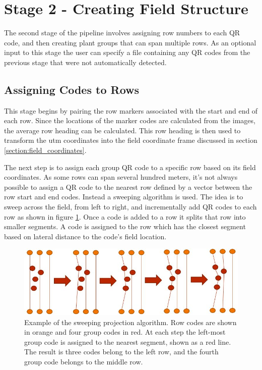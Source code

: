 \section{Stage 2 - Creating Field Structure}
\label{processing-stage2}

The second stage of the pipeline involves assigning row numbers to each QR code, and then creating plant groups that can span multiple rows.  As an optional input to this stage the user can specify a file containing any QR codes from the previous stage that were not automatically detected.  

\subsection{Assigning Codes to Rows}

This stage begins by pairing the row markers associated with the start and end of each row.  Since the locations of the marker codes are calculated from the images, the average row heading can be calculated.  This row heading is then used to transform the \ac{utm} coordinates into the field coordinate frame discussed in section \ref{section:field_coordinates}.

The next step is to assign each group QR code to a specific row based on its field coordinates.  As some rows can span several hundred meters, it's not always possible to assign a QR code to the nearest row defined by a vector between the row start and end codes.  Instead a sweeping algorithm is used.   The idea is to sweep across the field, from left to right, and incrementally add QR codes to each row as shown in figure \ref{figure:sweeping_algorithm}. Once a code is added to a row it splits that row into smaller segments.  A code is assigned to the row which has the closest segment based on lateral distance to the code's field location. 

\begin{figure}
	\centering
    \includegraphics[width=6in]{figures/sweeping_algorithm.jpg}
    \caption[Sweeping projection algorithm]{Example of the sweeping projection algorithm. Row codes are shown in orange and four group codes in red.  At each step the left-most group code is assigned to the nearest segment, shown as a red line.  The result is three codes belong to the left row, and the fourth group code belongs to the middle row.}
    \label{figure:sweeping_algorithm}
\end{figure}

